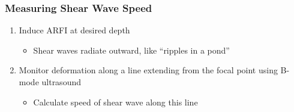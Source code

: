 \documentclass{beamer}
\begin{document}
		\begin{frame}
			\frametitle{Measuring Shear Wave Speed}
			\vspace{1cm}
			\begin{enumerate}
				\item<1-> Induce ARFI at desired depth
				\begin{itemize}
					\item Shear waves radiate outward, like ``ripples in a pond''
				\end{itemize}
				\item<2-> Monitor deformation along a line extending from the focal point using B-mode ultrasound
				\begin{itemize}
					\item<4-> Calculate speed of shear wave along this line
				\end{itemize}
			\end{enumerate}


\end{frame}
\end{document}
